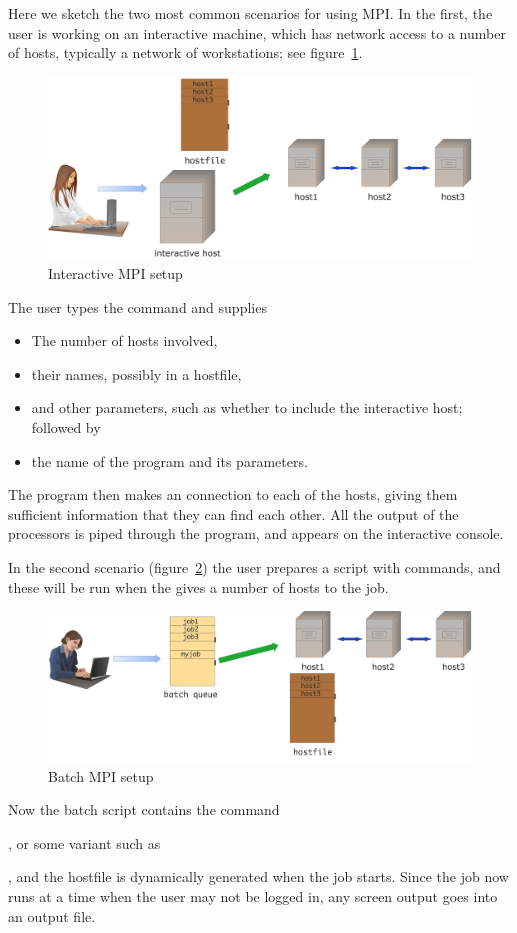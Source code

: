 Here we sketch the two most common scenarios for using MPI. In the
first, the user is working on an interactive machine, which has
network access to a number of hosts, typically a network of workstations;
see figure~\ref{fig:mpi-interactive}.
\begin{figure}[ht]
  \includegraphics[scale=.12]{graphics-public/mpi-interactive}
  \caption{Interactive MPI setup}
  \label{fig:mpi-interactive}
\end{figure}
The user types the command  and supplies
\begin{itemize}
\item The number of hosts involved,
\item their names, possibly in a hostfile,
\item and other parameters, such as whether to include the interactive
  host; followed by
\item the name of the program and its parameters.
\end{itemize}
The  program then makes an  connection
to each of the hosts, giving them sufficient information that they 
can find each other. All the output of the processors is piped through the 
 program, and appears on the interactive console.

In the second scenario (figure~\ref{fig:mpi-batch}) the user prepares
a  script with commands, and these will be
run when the  gives a number of hosts
to the job.
\begin{figure}[ht]
  \includegraphics[scale=.1]{graphics-public/mpi-batch}
  \caption{Batch MPI setup}
  \label{fig:mpi-batch}
\end{figure}
Now the batch script contains the  command%
\begin{istc}
, or some variant such as %
\end{istc}
, and the hostfile is dynamically generated when the job starts.
Since the job now runs at a time when the user may not be logged in, 
any screen output goes into an output file.


